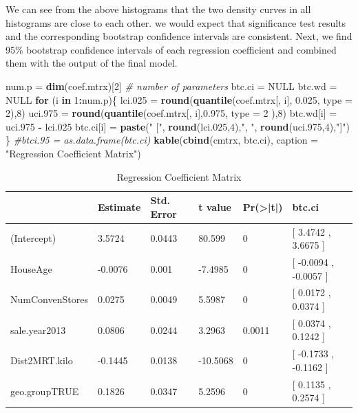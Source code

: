 \documentclass[
]{book}
\newenvironment{Shaded}{\begin{snugshade}}{\end{snugshade}}
\newcommand{\AttributeTok}[1]{\textcolor[rgb]{0.13,0.29,0.53}{#1}}
\newcommand{\CommentTok}[1]{\textcolor[rgb]{0.56,0.35,0.01}{\textit{#1}}}
\newcommand{\ConstantTok}[1]{\textcolor[rgb]{0.56,0.35,0.01}{#1}}
\newcommand{\ControlFlowTok}[1]{\textcolor[rgb]{0.13,0.29,0.53}{\textbf{#1}}}
\newcommand{\DecValTok}[1]{\textcolor[rgb]{0.00,0.00,0.81}{#1}}
\newcommand{\FloatTok}[1]{\textcolor[rgb]{0.00,0.00,0.81}{#1}}
\newcommand{\FunctionTok}[1]{\textcolor[rgb]{0.13,0.29,0.53}{\textbf{#1}}}
\newcommand{\NormalTok}[1]{#1}
\newcommand{\OtherTok}[1]{\textcolor[rgb]{0.56,0.35,0.01}{#1}}
\newcommand{\SpecialCharTok}[1]{\textcolor[rgb]{0.81,0.36,0.00}{\textbf{#1}}}
\newcommand{\StringTok}[1]{\textcolor[rgb]{0.31,0.60,0.02}{#1}}
\begin{document}
We can see from the above histograms that the two density curves in all histograms are close to each other. we would expect that significance test results and the corresponding bootstrap confidence intervals are consistent. Next, we find 95\% bootstrap confidence intervals of each regression coefficient and combined them with the output of the final model.

\begin{Shaded}
\begin{Highlighting}[]
\NormalTok{num.p }\OtherTok{=} \FunctionTok{dim}\NormalTok{(coef.mtrx)[}\DecValTok{2}\NormalTok{]  }\CommentTok{\# number of parameters}
\NormalTok{btc.ci }\OtherTok{=} \ConstantTok{NULL}
\NormalTok{btc.wd }\OtherTok{=} \ConstantTok{NULL}
\ControlFlowTok{for}\NormalTok{ (i }\ControlFlowTok{in} \DecValTok{1}\SpecialCharTok{:}\NormalTok{num.p)\{}
\NormalTok{  lci}\FloatTok{.025} \OtherTok{=} \FunctionTok{round}\NormalTok{(}\FunctionTok{quantile}\NormalTok{(coef.mtrx[, i], }\FloatTok{0.025}\NormalTok{, }\AttributeTok{type =} \DecValTok{2}\NormalTok{),}\DecValTok{8}\NormalTok{)}
\NormalTok{  uci}\FloatTok{.975} \OtherTok{=} \FunctionTok{round}\NormalTok{(}\FunctionTok{quantile}\NormalTok{(coef.mtrx[, i],}\FloatTok{0.975}\NormalTok{, }\AttributeTok{type =} \DecValTok{2}\NormalTok{ ),}\DecValTok{8}\NormalTok{)}
\NormalTok{  btc.wd[i] }\OtherTok{=}\NormalTok{  uci}\FloatTok{.975} \SpecialCharTok{{-}}\NormalTok{ lci}\FloatTok{.025}
\NormalTok{  btc.ci[i] }\OtherTok{=} \FunctionTok{paste}\NormalTok{(}\StringTok{"     ["}\NormalTok{, }\FunctionTok{round}\NormalTok{(lci}\FloatTok{.025}\NormalTok{,}\DecValTok{4}\NormalTok{),}\StringTok{", "}\NormalTok{, }\FunctionTok{round}\NormalTok{(uci}\FloatTok{.975}\NormalTok{,}\DecValTok{4}\NormalTok{),}\StringTok{"]"}\NormalTok{)}
\NormalTok{ \}}
\CommentTok{\#btci.95 = as.data.frame(btc.ci)}
\FunctionTok{kable}\NormalTok{(}\FunctionTok{cbind}\NormalTok{(cmtrx, btc.ci), }
      \AttributeTok{caption =} \StringTok{"Regression Coefficient Matrix"}\NormalTok{)}
\end{Highlighting}
\end{Shaded}

\begin{table}

\caption{\label{tab:unnamed-chunk-96}Regression Coefficient Matrix}
\centering
\begin{tabular}[t]{l|l|l|l|l|l}
\hline
  & Estimate & Std. Error & t value & Pr(>|t|) & btc.ci\\
\hline
(Intercept) & 3.5724 & 0.0443 & 80.599 & 0 & [ 3.4742 ,  3.6675 ]\\
\hline
HouseAge & -0.0076 & 0.001 & -7.4985 & 0 & [ -0.0094 ,  -0.0057 ]\\
\hline
NumConvenStores & 0.0275 & 0.0049 & 5.5987 & 0 & [ 0.0172 ,  0.0374 ]\\
\hline
sale.year2013 & 0.0806 & 0.0244 & 3.2963 & 0.0011 & [ 0.0374 ,  0.1242 ]\\
\hline
Dist2MRT.kilo & -0.1445 & 0.0138 & -10.5068 & 0 & [ -0.1733 ,  -0.1162 ]\\
\hline
geo.groupTRUE & 0.1826 & 0.0347 & 5.2596 & 0 & [ 0.1135 ,  0.2574 ]\\
\hline
\end{tabular}
\end{table}
\end{document}
